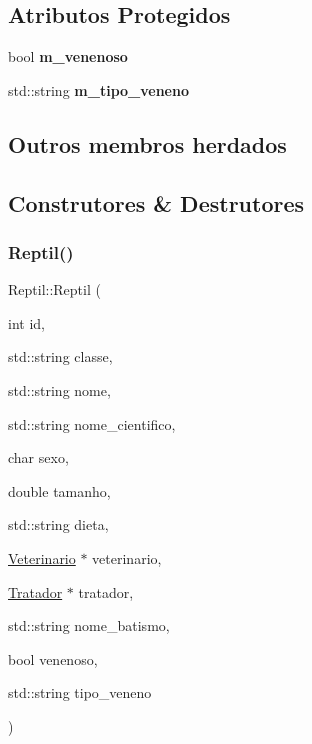 \subsection*{Atributos Protegidos}
\begin{DoxyCompactItemize}
\item 
\mbox{\label{classReptil_ac195c1dc9a0fa38bc0551034c609c434}} 
bool {\bfseries m\+\_\+venenoso}
\item 
\mbox{\label{classReptil_a1773bdc4a44d99b03b2f989ae219f1dc}} 
std\+::string {\bfseries m\+\_\+tipo\+\_\+veneno}
\end{DoxyCompactItemize}
\subsection*{Outros membros herdados}


\subsection{Construtores \& Destrutores}
\mbox{\label{classReptil_a5bd50bf15e8ee41022daf6b12d9c880e}} 
\subsubsection{\texorpdfstring{Reptil()}{Reptil()}\hspace{0.1cm}{\footnotesize\ttfamily [1/3]}}
{\footnotesize\ttfamily Reptil\+::\+Reptil (\begin{DoxyParamCaption}\item[{int}]{id,  }\item[{std\+::string}]{classe,  }\item[{std\+::string}]{nome,  }\item[{std\+::string}]{nome\+\_\+cientifico,  }\item[{char}]{sexo,  }\item[{double}]{tamanho,  }\item[{std\+::string}]{dieta,  }\item[{\hyperlink{classVeterinario}{Veterinario} $\ast$}]{veterinario,  }\item[{\hyperlink{classTratador}{Tratador} $\ast$}]{tratador,  }\item[{std\+::string}]{nome\+\_\+batismo,  }\item[{bool}]{venenoso,  }\item[{std\+::string}]{tipo\+\_\+veneno }\end{DoxyParamCaption})}



